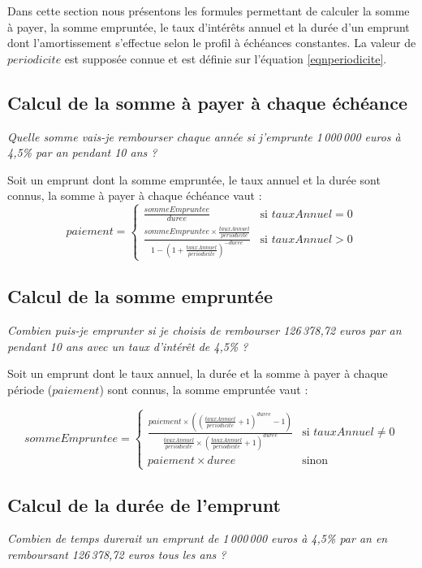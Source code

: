 \documentclass[11pt,a4paper]{scrartcl}
\begin{document}
Dans cette section nous présentons les formules permettant de calculer la somme à payer, la somme empruntée, le taux d'intérêts annuel et la durée d'un emprunt dont l'amortissement s'effectue selon le profil à échéances constantes. La valeur de $periodicite$ est supposée connue et est définie sur l'équation \ref{eqnperiodicite}.


\subsection{Calcul de la somme à payer à chaque échéance}
\emph{Quelle somme vais-je rembourser chaque année si j'emprunte 1\,000\,000 euros à 4,5\% par an pendant 10 ans ?}


Soit un emprunt dont la somme empruntée, le taux annuel et la durée sont connus, la somme à payer à chaque échéance vaut :
\begin{equation}
	paiement=\begin{cases}
	\frac{sommeEmpruntee}{duree} & \text{si } tauxAnnuel = 0 \\
	\frac{sommeEmpruntee \times \frac{tauxAnnuel}{periodicite}}{1-(1+\frac{tauxAnnuel}{periodicite})^{-duree}} & \text{si } tauxAnnuel > 0
	\end{cases}
\end{equation}
		

\subsection{Calcul de la somme empruntée}
\emph{Combien puis-je emprunter si je choisis de rembourser 126\,378,72 euros par an pendant 10 ans avec un taux d'intérêt de 4,5\% ?}

Soit un emprunt dont le taux annuel, la durée et la somme à payer à chaque période ($paiement$) sont connus, la somme empruntée vaut :

		\begin{equation}
			sommeEmpruntee=
			\begin{cases}
				\frac{paiement \times ((\frac{tauxAnnuel}{periodicite}+1)^{duree}-1)}{\frac{tauxAnnuel}{periodicite} \times (\frac{tauxAnnuel}{periodicite}+1)^{duree}}&\text{si }tauxAnnuel \neq 0\\
				paiement \times duree&\text{sinon}
			\end{cases}
		\end{equation}

\subsection{Calcul de la durée de l'emprunt}
\emph{Combien de temps durerait un emprunt de 1\,000\,000 euros à 4,5\% par an en remboursant 126\,378,72 euros tous les ans ?}
\end{document}
